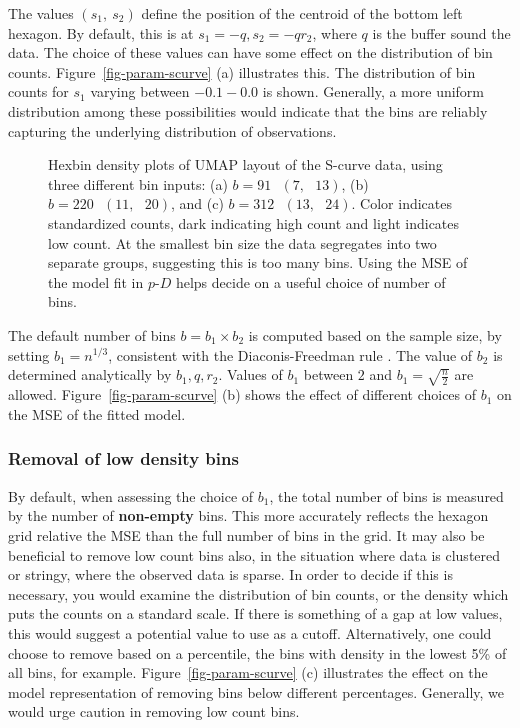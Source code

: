 \documentclass[
  12pt]{article}
\begin{document}
The values \((s_1, \ s_2)\) define the position of the centroid of the
bottom left hexagon. By default, this is at \(s_1 = -q, s_2 = -qr_2\),
where \(q\) is the buffer sound the data. The choice of these values can
have some effect on the distribution of bin counts.
Figure~\ref{fig-param-scurve} (a) illustrates this. The distribution of
bin counts for \(s_1\) varying between \(-0.1-0.0\) is shown. Generally,
a more uniform distribution among these possibilities would indicate
that the bins are reliably capturing the underlying distribution of
observations.

\begin{figure}[H]


\caption{\label{fig-bins-scurve}Hexbin density plots of UMAP layout of
the S-curve data, using three different bin inputs: (a)
\(b = 91 \text{ } (7, \text{ }13)\), (b)
\(b = 220 \text{ } (11, \text{ }20)\), and (c)
\(b = 312 \text{ } (13, \text{ }24)\). Color indicates standardized
counts, dark indicating high count and light indicates low count. At the
smallest bin size the data segregates into two separate groups,
suggesting this is too many bins. Using the MSE of the model fit in
\(p\text{-}D\) helps decide on a useful choice of number of bins.}

\end{figure}%

The default number of bins \(b=b_1\times b_2\) is computed based on the
sample size, by setting \(b_1=n^{1/3}\), consistent with the
Diaconis-Freedman rule \citep{freedman1981}. The value of \(b_2\) is
determined analytically by \(b_1, q, r_2\). Values of \(b_1\) between
\(2\) and \(b_1 = \sqrt{\frac{n}{2}}\) are allowed.
Figure~\ref{fig-param-scurve} (b) shows the effect of different choices
of \(b_1\) on the MSE of the fitted model.

\subsubsection{Removal of low density
bins}\label{removal-of-low-density-bins}

By default, when assessing the choice of \(b_1\), the total number of
bins is measured by the number of \textbf{non-empty} bins. This more
accurately reflects the hexagon grid relative the MSE than the full
number of bins in the grid. It may also be beneficial to remove low
count bins also, in the situation where data is clustered or stringy,
where the observed data is sparse. In order to decide if this is
necessary, you would examine the distribution of bin counts, or the
density which puts the counts on a standard scale. If there is something
of a gap at low values, this would suggest a potential value to use as a
cutoff. Alternatively, one could choose to remove based on a percentile,
the bins with density in the lowest 5\% of all bins, for example.
Figure~\ref{fig-param-scurve} (c) illustrates the effect on the model
representation of removing bins below different percentages. Generally,
we would urge caution in removing low count bins.
\end{document}

